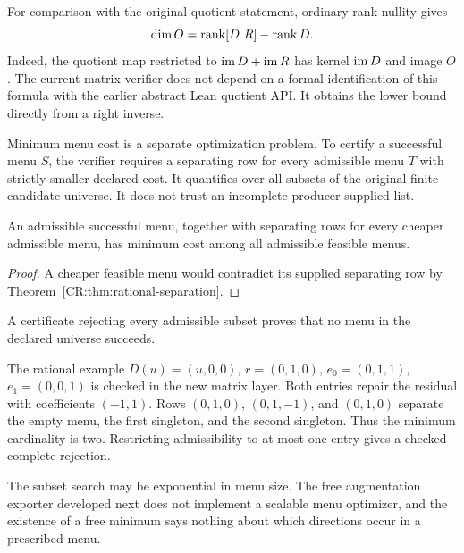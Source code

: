 For comparison with the original quotient statement, ordinary rank-nullity gives
\begin{equation}\label{CR:eq:rank-difference-new}
 \dim O=\operatorname{rank}[D\ R]-\operatorname{rank} D.
\end{equation}
Indeed, the quotient map restricted to $\operatorname{im} D+\operatorname{im} R$ has kernel $\operatorname{im} D$ and image $O$. The current matrix verifier does not depend on a formal identification of this formula with the earlier abstract Lean quotient API. It obtains the lower bound directly from a right inverse.

Minimum menu cost is a separate optimization problem. To certify a successful menu $S$, the verifier requires a separating row for every admissible menu $T$ with strictly smaller declared cost. It quantifies over all subsets of the original finite candidate universe. It does not trust an incomplete producer-supplied list.

\begin{CRtheorem}
An admissible successful menu, together with separating rows for every cheaper admissible menu, has minimum cost among all admissible feasible menus.
\end{CRtheorem}
\begin{proof}
A cheaper feasible menu would contradict its supplied separating row by Theorem~\ref{CR:thm:rational-separation}.
\end{proof}

A certificate rejecting every admissible subset proves that no menu in the declared universe succeeds.

The rational example $D(u)=(u,0,0)$, $r=(0,1,0)$, $e_0=(0,1,1)$, $e_1=(0,0,1)$ is checked in the new matrix layer. Both entries repair the residual with coefficients $(-1,1)$. Rows $(0,1,0)$, $(0,1,-1)$, and $(0,1,0)$ separate the empty menu, the first singleton, and the second singleton. Thus the minimum cardinality is two. Restricting admissibility to at most one entry gives a checked complete rejection.

The subset search may be exponential in menu size. The free augmentation exporter developed next does not implement a scalable menu optimizer, and the existence of a free minimum says nothing about which directions occur in a prescribed menu.

